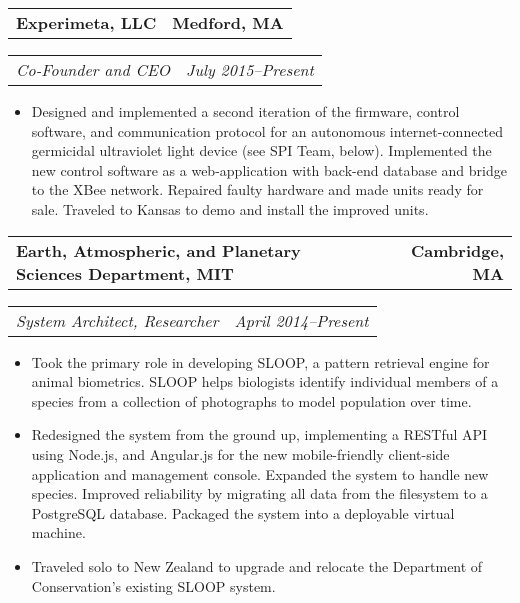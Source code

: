 \documentclass[10pt,letterpaper]{article}
\newcommand{\headerrow}[2]{%
    \begin{tabularx}{\linewidth}{Xr}
	    #1 & #2 \\
    \end{tabularx}
}
\begin{document}
    \headerrow{\textbf{Experimeta, LLC}}{\textbf{Medford, MA}}
    \headerrow{\textit{Co-Founder and CEO}}{\textit{July 2015--Present}}
    \begin{itemize}[label=--]
        \item Designed and implemented a second iteration of the firmware,
            control software, and communication protocol for an autonomous
            internet-connected germicidal ultraviolet light device (see SPI
            Team, below).  Implemented the new control software as a
            web-application with back-end database and bridge to the XBee
            network.  Repaired faulty hardware and made units ready for sale.
            Traveled to Kansas to demo and install the improved units.
    \end{itemize}

    \headerrow{\textbf{Earth, Atmospheric, and Planetary Sciences Department, MIT}}
        {\textbf{Cambridge, MA}}
    \headerrow{\textit{System Architect, Researcher}}{\textit{April 2014--Present}}
    \begin{itemize}[label=--]
        \item Took the primary role in developing SLOOP, a pattern retrieval
            engine for animal biometrics.  SLOOP helps biologists identify
            individual members of a species from a collection of photographs to
            model population over time.

        \item Redesigned the system from the ground up, implementing a RESTful
            API using Node.js, and Angular.js for the new mobile-friendly
            client-side application and management console. Expanded the system
            to handle new species.  Improved reliability by migrating all data
            from the filesystem to a PostgreSQL database.  Packaged the system
            into a deployable virtual machine.

        \item Traveled solo to New Zealand to upgrade and relocate the
            Department of Conservation's existing SLOOP system.
    \end{itemize}
\end{document}
